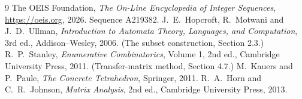 \documentclass[11pt,a4paper]{article}
\theoremstyle{plain}
\theoremstyle{definition}
\begin{document}
\begin{thebibliography}{9}
 The OEIS Foundation, \emph{The On-Line Encyclopedia of Integer
Sequences}, \url{https://oeis.org}, 2026. Sequence A219382.
 J.~E.~Hopcroft, R.~Motwani and J.~D.~Ullman, \emph{Introduction to Automata
Theory, Languages, and Computation}, 3rd ed., Addison--Wesley, 2006. (The subset
construction, Section 2.3.)
 R.~P.~Stanley, \emph{Enumerative Combinatorics}, Volume 1, 2nd ed.,
Cambridge University Press, 2011. (Transfer-matrix method, Section 4.7.)
 M.~Kauers and P.~Paule, \emph{The Concrete Tetrahedron}, Springer, 2011.
 R.~A.~Horn and C.~R.~Johnson, \emph{Matrix Analysis}, 2nd ed., Cambridge
University Press, 2013.
\end{thebibliography}
\end{document}
